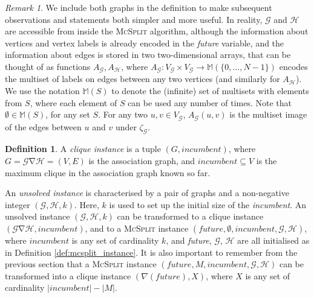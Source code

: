 \documentclass{l4proj}
\theoremstyle{definition}
\newtheorem{definition}{Definition}[chapter]
\theoremstyle{remark}
\newtheorem{remark}{Remark}[chapter]
\DeclareMathOperator{\nablaop}{\nabla}
\begin{document}
\begin{remark}
  We include both graphs in the definition to make subsequent observations and
  statements both simpler and more useful. In reality, $\mathcal{G}$ and
  $\mathcal{H}$ are accessible from inside the \textsc{McSplit} algorithm,
  although the information about vertices and vertex labels is already encoded
  in the \textit{future} variable, and the information about edges is stored in
  two two-dimensional arrays, that can be thought of as functions
  $A_{\mathcal{G}}, A_{\mathcal{H}}$, where $A_{\mathcal{G}} \colon
  V_{\mathcal{G}} \times V_{\mathcal{G}} \to \mathbb{M}(\{ 0, \dots, N - 1 \})$
  encodes the multiset of labels on edges between any two vertices (and
  similarly for $A_{\mathcal{H}}$). We use the notation $\mathbb{M}(S)$ to
  denote the (infinite) set of multisets with elements from $S$, where each
  element of $S$ can be used any number of times. Note that $\emptyset \in
  \mathbb{M}(S)$, for any set $S$. For any two $u, v \in V_{\mathcal{G}}$,
  $A_{\mathcal{G}}(u, v)$ is the multiset image of the edges between $u$ and $v$
  under $\zeta_{\mathcal{G}}$.
\end{remark}

\begin{definition}
  A \emph{clique instance} is a tuple $(G, \textit{incumbent})$, where $G =
  \mathcal{G} \nablaop \mathcal{H} = (V, E)$ is the association graph, and
  $\textit{incumbent} \subseteq V$ is the maximum clique in the association
  graph known so far.
\end{definition}

\noindent An \emph{unsolved instance} is characterised by a pair of graphs and a
non-negative integer $(\mathcal{G}, \mathcal{H}, k)$. Here, $k$ is used to set
up the initial size of the \textit{incumbent}. An unsolved instance
$(\mathcal{G}, \mathcal{H}, k)$ can be transformed to a clique instance
$(\mathcal{G} \nablaop \mathcal{H}, \textit{incumbent})$, and to a
\textsc{McSplit} instance $(\textit{future}, \emptyset, \textit{incumbent},
\mathcal{G}, \mathcal{H})$, where $\textit{incumbent}$ is any set of
cardinality $k$, and \textit{future}, $\mathcal{G}$, $\mathcal{H}$ are
all initialised as in Definition \ref{def:mcsplit_instance}. It is also
important to remember from the previous section that a \textsc{McSplit} instance
$(\textit{future}, M, \textit{incumbent}, \mathcal{G}, \mathcal{H})$ can
be transformed into a clique instance $(\nabla(\textit{future}), X)$, where $X$
is any set of cardinality $|\textit{incumbent}| - |M|$.
\end{document}
